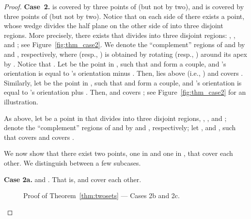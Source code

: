 \documentclass[11pt,letter]{article}
\newcommand{\old}[1]{{{}}}
\begin{document}
\begin{proof}
\old{
\begin{figure}[htp]
   \centering
       \texttt{[image: fig/thm\_figure6]}
   \caption{Proof of Theorem~\ref{thm:twosets} --- Case 2.}
   \label{fig:thm_case2}
\end{figure}
}

{\bf Case~2.}
 is covered by three points of  (but not by two), and  is covered by three points of  (but not by two).
Notice that on each side of  there exists a point, whose wedge
divides the half plane on the other side of  into three disjoint regions.
More precisely, there exists  that divides 
into three disjoint regions:
, , and ; see Figure~\ref{fig:thm_case2}.
We denote the ``complement'' regions of  and  by  and , respectively, where  (resp., ) is obtained by rotating  (resp., ) around its apex by .
Notice that .
Let  be the point in , such that  and  form a couple, and 's orientation is equal to 's orientation minus .
Then,  lies above  (i.e., ) and  covers .
Similarly, let  be the point in , such that  and  form a couple, and 's orientation is equal to 's orientation plus . Then,  and  covers ; see Figure~\ref{fig:thm_case2} for an illustration.

As above, let  be a point in  that divides  into three disjoint regions,
, , and ; denote the
``complement'' regions of  and  by  and , respectively;
let ,
 and
, such that
 covers  and  covers .

We now show that there exist two points, one in  and one in , that cover each other.
We distinguish between a few subcases.



\noindent
{\bf Case 2a.}  and . That is,  and  cover each other.


\begin{figure}[htb]
 \centering
 \hspace{0.5cm}
\caption{Proof of Theorem~\ref{thm:twosets} --- Cases 2b and 2c.}
\end{figure}



\old{
\begin{figure}[htp]
   \centering
       \texttt{[image: fig/thm\_figure7]}
   \caption{Proof of Theorem~\ref{thm:twosets} --- Case 2b.}
   \label{fig:thm_case2b}
\end{figure}
}


\end{proof}
\end{document}
